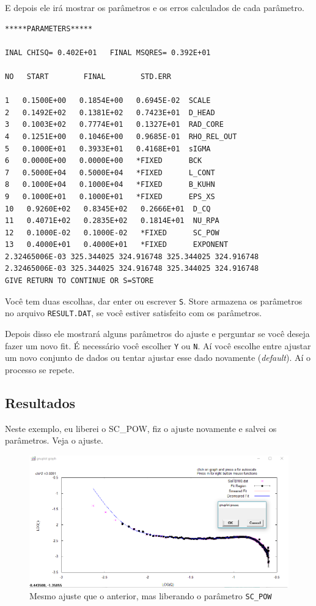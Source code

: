 \begin{apendicesenv}
E depois ele irá mostrar os parâmetros e os erros calculados de cada parâmetro.

\begin{verbatim}
*****PARAMETERS*****

INAL CHISQ= 0.402E+01   FINAL MSQRES= 0.392E+01

NO   START        FINAL        STD.ERR

1   0.1500E+00   0.1854E+00   0.6945E-02  SCALE
2   0.1492E+02   0.1381E+02   0.7423E+01  D_HEAD
3   0.1003E+02   0.7774E+01   0.1327E+01  RAD_CORE
4   0.1251E+00   0.1046E+00   0.9685E-01  RHO_REL_OUT
5   0.1000E+01   0.3933E+01   0.4168E+01  sIGMA
6   0.0000E+00   0.0000E+00   *FIXED      BCK
7   0.5000E+04   0.5000E+04   *FIXED      L_CONT
8   0.1000E+04   0.1000E+04   *FIXED      B_KUHN
9   0.1000E+01   0.1000E+01   *FIXED      EPS_XS
10   0.9260E+02   0.8345E+02   0.2666E+01  D_CQ
11   0.4071E+02   0.2835E+02   0.1814E+01  NU_RPA
12   0.1000E-02   0.1000E-02   *FIXED      SC_POW
13   0.4000E+01   0.4000E+01   *FIXED      EXPONENT
2.32465006E-03 325.344025 324.916748 325.344025 324.916748
2.32465006E-03 325.344025 324.916748 325.344025 324.916748
GIVE RETURN TO CONTINUE OR S=STORE
\end{verbatim}

Você tem duas escolhas, dar enter ou escrever \texttt{S}. Store armazena os parâmetros no arquivo \texttt{RESULT.DAT}, se você estiver satisfeito com os parâmetros.

Depois disso ele mostrará alguns parâmetros do ajuste e perguntar se você deseja fazer um novo fit. É necessário você escolher \texttt{Y} ou \texttt{N}. Aí você escolhe entre ajustar um novo conjunto de dados ou tentar ajustar esse dado novamente (\textit{default}). Aí o processo se repete.

\subsection{Resultados}

Neste exemplo, eu liberei o SC\_POW, fiz o ajuste novamente e salvei os parâmetros. Veja o ajuste.

\begin{figure}
	\centering
	\includegraphics[scale=0.5]{./imagens/saxs/supersaxs_gnuplot_fit2}
	\centering
	\caption{Mesmo ajuste que o anterior, mas liberando o parâmetro \texttt{SC\_POW}}
\end{figure}


\end{apendicesenv}
